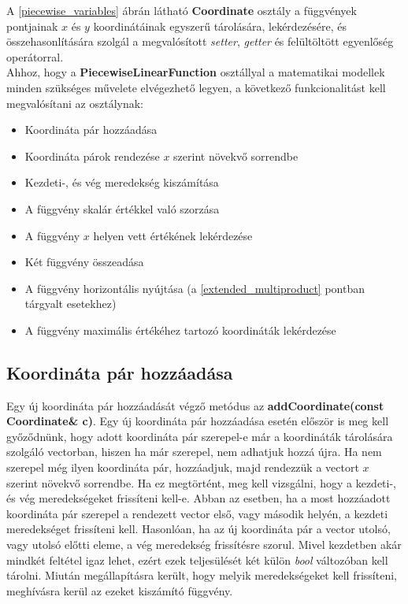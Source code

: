 A \ref{piecewise_variables} ábrán látható \textbf{Coordinate} osztály a függvények pontjainak $x$ és $y$ koordinátáinak egyszerű tárolására, lekérdezésére, és összehasonlítására szolgál a megvalósított \textit{setter}, \textit{getter} és felültöltött egyenlőség operátorral.\\
Ahhoz, hogy a \textbf{PiecewiseLinearFunction} osztállyal a matematikai modellek minden szükséges művelete elvégezhető legyen, a következő funkcionalitást kell megvalósítani az osztálynak:
\begin{itemize}
\item Koordináta pár hozzáadása
\item Koordináta párok rendezése $x$ szerint növekvő sorrendbe
\item Kezdeti-, és vég meredekség kiszámítása
\item A függvény skalár értékkel való szorzása
\item A függvény $x$ helyen vett értékének lekérdezése
\item Két függvény összeadása
\item A függvény horizontális nyújtása (a \ref{extended_multiproduct} pontban tárgyalt esetekhez)
\item A függvény maximális értékéhez tartozó koordináták lekérdezése
\end{itemize} 
\subsection{Koordináta pár hozzáadása} \label{addCoordinates}
Egy új koordináta pár hozzáadását végző metódus az \textbf{addCoordinate(const Coordinate\& c)}. Egy új koordináta pár hozzáadása esetén először is meg kell győződnünk, hogy adott koordináta pár szerepel-e már a koordináták tárolására szolgáló vectorban, hiszen ha már szerepel, nem adhatjuk hozzá újra. Ha nem szerepel még ilyen koordináta pár, hozzáadjuk, majd rendezzük a vectort $x$ szerint növekvő sorrendbe. Ha ez megtörtént, meg kell vizsgálni, hogy a kezdeti-, és vég meredekségeket frissíteni kell-e. Abban az esetben, ha a most hozzáadott koordináta pár szerepel a rendezett vector első, vagy második helyén, a kezdeti meredekséget frissíteni kell. Hasonlóan, ha az új koordináta pár a vector utolsó, vagy utolsó előtti eleme, a vég meredekség frissítésre szorul. Mivel kezdetben akár mindkét feltétel igaz lehet, ezért ezek teljesülését két külön \textit{bool} változóban kell tárolni. Miután megállapításra került, hogy melyik meredekségeket kell frissíteni, meghívásra kerül az ezeket kiszámító függvény. 
